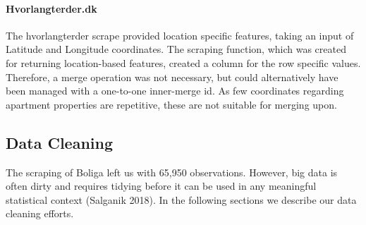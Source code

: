 \documentclass[12pt,a4paper]{article}
\begin{document}
\paragraph{Hvorlangterder.dk\newline}
The hvorlangterder scrape provided location specific features, taking an input of Latitude and Longitude coordinates. The scraping function, which was created for returning location-based features, created a column for the row specific values. Therefore, a merge operation was not necessary, but could alternatively have been managed with a one-to-one inner-merge id. As few coordinates regarding apartment properties are repetitive, these are not suitable for merging upon. 

\subsection{Data Cleaning}
The scraping of Boliga left us with 65,950 observations. However, big data is often dirty and requires tidying before it can be used in any meaningful statistical context (Salganik 2018). In the following sections we describe our data cleaning efforts. 
\end{document}
